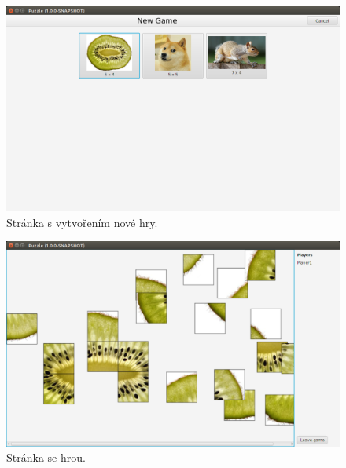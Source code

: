 \documentclass[12pt, a4paper]{report}
\begin{document}
\begin{figure}[H]
	\centering
	\includegraphics[width=1\linewidth]{img-scr-new}
	\caption{Stránka s vytvořením nové hry.}
\end{figure}

\begin{figure}[H]
	\centering
	\includegraphics[width=1\linewidth]{img-scr-game}
	\caption{Stránka se hrou.}
\end{figure}
\end{document}
